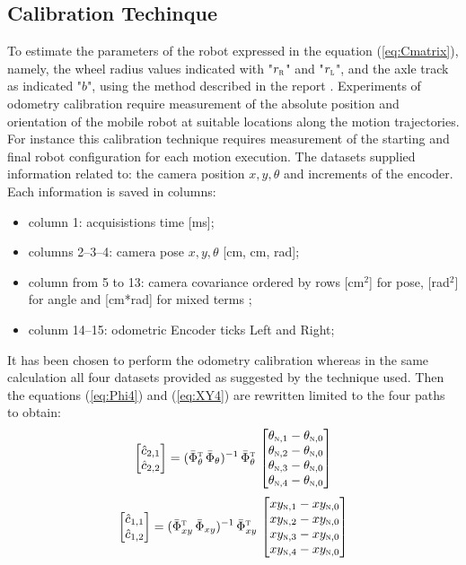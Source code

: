 \subsection{Calibration Techinque}
To estimate the parameters of the robot expressed in the equation (\ref{eq:Cmatrix}), namely, the wheel radius values indicated with "$r_\textsc{r}$" and "$r_\textsc{l}$", and the axle track as indicated "$b$", using the method described in the report \cite{1512356}.
Experiments of odometry calibration require measurement of the absolute position and orientation of the mobile robot at suitable locations along the motion trajectories. For instance this calibration technique requires measurement of the starting and final robot configuration for each motion execution. The datasets supplied information related to: the camera position $x, y, \theta$ and increments of the encoder. Each information is saved in columns: 
\begin{itemize}
\item column 1: acquisistions time [ms];
\item columns 2--3--4: camera pose $x, y, \theta$ [cm, cm, rad];
\item column from 5 to 13: camera covariance ordered by rows [cm$^2$] for pose, [rad$^2$] for angle and [cm*rad] for mixed terms ;
\item colunm 14--15: odometric Encoder ticks Left and Right;
\end{itemize}
It has been chosen to perform the odometry calibration whereas in the same calculation all four datasets provided as suggested by the technique used. Then the equations (\ref{eq:Phi4}) and (\ref{eq:XY4}) are rewritten limited to the four paths to obtain:
\begin{equation}
\label{eq:Phi4}
	\begin{bmatrix}
		\hat{c}_{2,1}\\
		\hat{c}_{2,2}
	\end{bmatrix} =	(\bar{\Phi}_{\theta}^{\textsc{t}} \, \bar{\Phi}_{\theta})^{-1} \, \bar{\Phi}_{\theta}^{\textsc{t}} \, 
	\begin{bmatrix}
		\theta_{\textsc{n},1} - \theta_{\textsc{n},0}\\
		\theta_{\textsc{n},2} - \theta_{\textsc{n},0}\\
		\theta_{\textsc{n},3} - \theta_{\textsc{n},0}\\
		\theta_{\textsc{n},4} - \theta_{\textsc{n},0}
	\end{bmatrix}
\end{equation}
\begin{equation}
\label{eq:XY4}
	\begin{bmatrix}
		\hat{c}_{1,1}\\
		\hat{c}_{1,2}
	\end{bmatrix} = (\bar{\Phi}_{xy}^{\textsc{t}} \, \bar{\Phi}_{xy})^{-1} \, \bar{\Phi}_{xy}^{\textsc{t}} \, 
	\begin{bmatrix}
		xy_{\textsc{n},1} - xy_{\textsc{n},0}\\
		xy_{\textsc{n},2} - xy_{\textsc{n},0}\\
		xy_{\textsc{n},3} - xy_{\textsc{n},0}\\
		xy_{\textsc{n},4} - xy_{\textsc{n},0}
	\end{bmatrix}
\end{equation}
